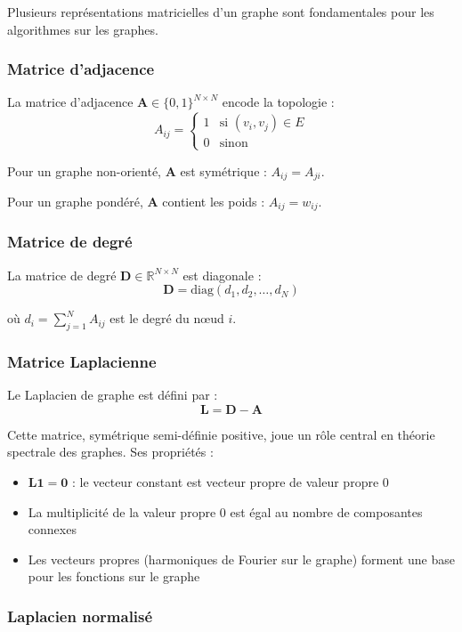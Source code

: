Plusieurs représentations matricielles d'un graphe sont fondamentales pour les algorithmes sur les graphes.

\subsubsection{Matrice d'adjacence}

La matrice d'adjacence $\mathbf{A} \in \{0,1\}^{N \times N}$ encode la topologie :
\[
A_{ij} = \begin{cases}
1 & \text{si } (v_i, v_j) \in E \\
0 & \text{sinon}
\end{cases}
\]

Pour un graphe non-orienté, $\mathbf{A}$ est symétrique : $A_{ij} = A_{ji}$.

Pour un graphe pondéré, $\mathbf{A}$ contient les poids : $A_{ij} = w_{ij}$.

\subsubsection{Matrice de degré}

La matrice de degré $\mathbf{D} \in \mathbb{R}^{N \times N}$ est diagonale :
\[
\mathbf{D} = \text{diag}(d_1, d_2, \ldots, d_N)
\]

où $d_i = \sum_{j=1}^N A_{ij}$ est le degré du nœud $i$.

\subsubsection{Matrice Laplacienne}

Le Laplacien de graphe est défini par :
\[
\mathbf{L} = \mathbf{D} - \mathbf{A}
\]

Cette matrice, symétrique semi-définie positive, joue un rôle central en théorie spectrale des graphes. Ses propriétés :
\begin{itemize}
    \item $\mathbf{L}\mathbf{1} = \mathbf{0}$ : le vecteur constant est vecteur propre de valeur propre 0
    \item La multiplicité de la valeur propre 0 est égal au nombre de composantes connexes
    \item Les vecteurs propres (harmoniques de Fourier sur le graphe) forment une base pour les fonctions sur le graphe
\end{itemize}

\subsubsection{Laplacien normalisé}

